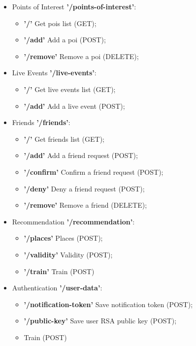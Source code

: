 \documentclass[../../main]{subfiles}
\begin{document}
\begin{itemize}
    \item Points of Interest \textbf{'/points-of-interest'}:
    \begin{itemize}
        \item \textbf{'/'} Get pois list (GET);
        \item \textbf{'/add'} Add a poi (POST);
        \item \textbf{'/remove'} Remove a poi (DELETE);
    \end{itemize}

    \item Live Events \textbf{'/live-events'}:
    \begin{itemize}
        \item \textbf{'/'} Get live events list (GET);
        \item \textbf{'/add'} Add a live event (POST);
    \end{itemize}

    \item Friends \textbf{'/friends'}:
    \begin{itemize}
        \item \textbf{'/'} Get friends list (GET);
        \item \textbf{'/add'} Add a friend request (POST);
        \item \textbf{'/confirm'} Confirm a friend request (POST);
        \item \textbf{'/deny'} Deny a friend request (POST);
        \item \textbf{'/remove'} Remove a friend (DELETE);
    \end{itemize}

    \item Recommendation \textbf{'/recommendation'}:
    \begin{itemize}
        \item \textbf{'/places'} Places (POST);
        \item \textbf{'/validity'} Validity (POST);
        \item \textbf{'/train'} Train (POST)
    \end{itemize}

    \item Authentication \textbf{'/user-data'}:
    \begin{itemize}
        \item \textbf{'/notification-token'} Save notification token (POST);
        \item \textbf{'/public-key'} Save user RSA public key (POST);
        \item Train (POST)
    \end{itemize}

\end{itemize}
\end{document}

